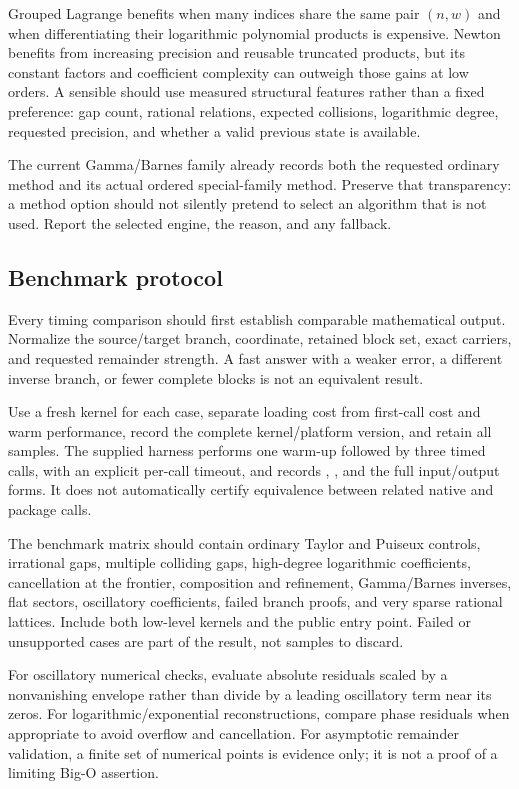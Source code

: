 Grouped Lagrange benefits when many indices share the same pair $(n,w)$ and when differentiating their logarithmic polynomial products is expensive. Newton benefits from increasing precision and reusable truncated products, but its constant factors and coefficient complexity can outweigh those gains at low orders. A sensible  should use measured structural features rather than a fixed preference: gap count, rational relations, expected collisions, logarithmic degree, requested precision, and whether a valid previous state is available.

The current Gamma/Barnes family already records both the requested ordinary method and its actual ordered special-family method. Preserve that transparency: a method option should not silently pretend to select an algorithm that is not used. Report the selected engine, the reason, and any fallback.\cite{gamma}

\subsection{Benchmark protocol}
Every timing comparison should first establish comparable mathematical output. Normalize the source/target branch, coordinate, retained block set, exact carriers, and requested remainder strength. A fast answer with a weaker error, a different inverse branch, or fewer complete blocks is not an equivalent result.

Use a fresh kernel for each case, separate loading cost from first-call cost and warm performance, record the complete kernel/platform version, and retain all samples. The supplied harness performs one warm-up followed by three timed calls, with an explicit per-call timeout, and records , , and the full input/output forms. It does not automatically certify equivalence between related native and package calls.

The benchmark matrix should contain ordinary Taylor and Puiseux controls, irrational gaps, multiple colliding gaps, high-degree logarithmic coefficients, cancellation at the frontier, composition and refinement, Gamma/Barnes inverses, flat sectors, oscillatory coefficients, failed branch proofs, and very sparse rational lattices. Include both low-level kernels and the public entry point. Failed or unsupported cases are part of the result, not samples to discard.

For oscillatory numerical checks, evaluate absolute residuals scaled by a nonvanishing envelope rather than divide by a leading oscillatory term near its zeros. For logarithmic/exponential reconstructions, compare phase residuals when appropriate to avoid overflow and cancellation. For asymptotic remainder validation, a finite set of numerical points is evidence only; it is not a proof of a limiting Big-O assertion.


